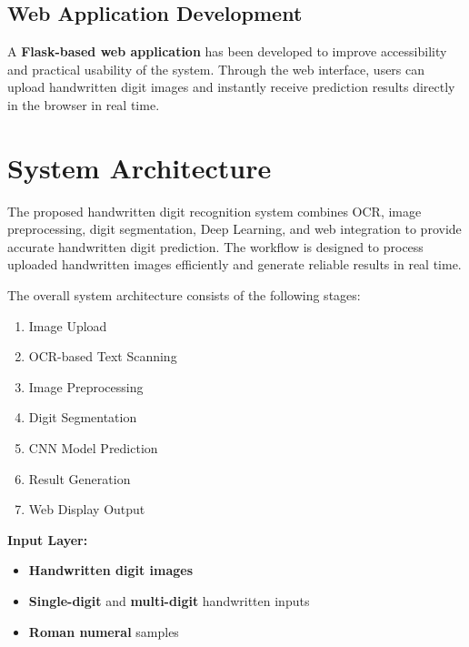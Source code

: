 \documentclass[12pt,a4paper]{article}
\begin{document}

\subsection{Web Application Development}

\vspace{0.2cm}

\noindent
A \textbf{Flask-based web application} has been developed to improve accessibility and practical usability of the system. Through the web interface, users can upload handwritten digit images and instantly receive prediction results directly in the browser in real time.

\newpage

\section{System Architecture}

\vspace{0.3cm}

\noindent
The proposed handwritten digit recognition system combines OCR, image preprocessing, digit segmentation, Deep Learning, and web integration to provide accurate handwritten digit prediction. The workflow is designed to process uploaded handwritten images efficiently and generate reliable results in real time.

\vspace{0.4cm}

\noindent
The overall system architecture consists of the following stages:

\begin{enumerate}
\item {Image Upload}
\item {OCR-based Text Scanning}
\item {Image Preprocessing}
\item {Digit Segmentation}
\item {CNN Model Prediction}
\item {Result Generation}
\item {Web Display Output}
\end{enumerate}

\vspace{0.4cm}

\noindent
\textbf{Input Layer:}

\begin{itemize}
\item \textbf{Handwritten digit images}
\item \textbf{Single-digit} and \textbf{multi-digit} handwritten inputs
\item \textbf{Roman numeral} samples
\end{itemize}
\end{document}
